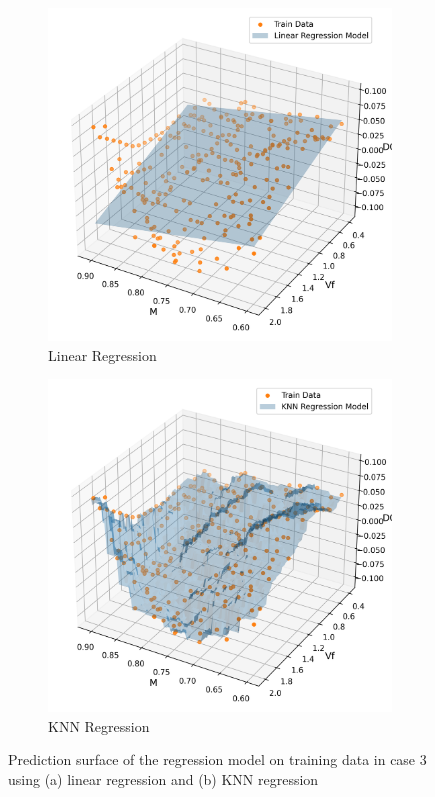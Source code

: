\documentclass[conf]{new-aiaa}
\begin{document}
\begin{figure}[H]
    \centering
    \begin{subfigure}{0.4\textwidth}
        \centering
        \includegraphics[width=1.0\textwidth]{graph/case3_lr_plane.png}
        \caption{Linear Regression}
    \end{subfigure}
    \hfill
    \begin{subfigure}{0.4\textwidth}
        \centering
        \includegraphics[width=1.0\textwidth]{graph/case3_knnr_plane.png}
        \caption{KNN Regression}
    \end{subfigure}

    \caption{Prediction surface of the regression model on training data in case 3 using (a) linear regression and (b) KNN regression}
    \label{fig:case3_lr_knnr_plane}
\end{figure}
\end{document}
